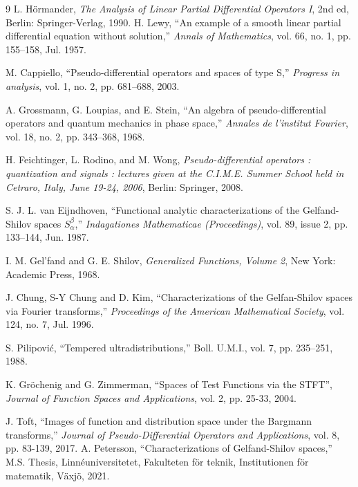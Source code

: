 \documentclass[11pt,a4paper,reqno]{amsart}
\numberwithin{equation}{section}
\theoremstyle{definition}
\theoremstyle{definition}
\begin{document}
\begin{thebibliography}{9}
    L. Hörmander,
    \emph{The Analysis of Linear Partial Differential Operators I}, 2nd ed,
    Berlin: Springer-Verlag,
    1990.
    H. Lewy,
    ``An example of a smooth linear partial differential equation without solution,''
    \emph{Annals of Mathematics}, vol. 66, no. 1, pp. 155--158, Jul. 1957.

    M. Cappiello,
    ``Pseudo-differential operators and spaces of type S,''
    \emph{Progress in analysis}, vol. 1, no. 2, pp. 681--688, 2003.
    
    A. Grossmann, G. Loupias, and E. Stein,
    ``An algebra of pseudo-differential operators and quantum mechanics in phase space,''
    \emph{Annales de l’institut Fourier}, vol. 18, no. 2, pp. 343--368, 
    1968.

    H. Feichtinger, L. Rodino, and M. Wong,
    \emph{Pseudo-differential operators : quantization and signals : lectures given at the C.I.M.E. Summer School held in Cetraro, Italy, June 19-24, 2006},
    Berlin: Springer,
    2008.
      
    S. J. L. van Eijndhoven,
    ``Functional analytic characterizations of the Gelfand-Shilov spaces $S_\alpha^\beta$,''
    \emph{Indagationes Mathematicae (Proceedings)}, vol. 89, issue 2, pp. 133--144, Jun. 1987.
    
    I. M. Gel'fand and G. E. Shilov,
    \emph{Generalized Functions, Volume 2}, New York: Academic Press, 1968.

    J. Chung, S-Y Chung and D. Kim,
    ``Characterizations of the Gelfan-Shilov spaces via Fourier transforms,'' 
    \emph{Proceedings of the American Mathematical Society}, vol. 124, no. 7, Jul. 1996.
    
    S. Pilipović, 
    ``Tempered ultradistributions,'' Boll. U.M.I., vol. 7, pp. 235--251,
    1988.

    K. Gröchenig and G. Zimmerman,
    ``Spaces of Test Functions via the STFT'',
    \emph{Journal of Function Spaces and Applications}, vol. 2, pp. 25-33, 2004.

    J. Toft,
    ``Images of function and distribution space under the Bargmann transforms,''
    \emph{Journal of Pseudo-Differential Operators and Applications}, vol. 8, pp. 83-139, 2017.
    A. Petersson,
    ``Characterizations of Gelfand-Shilov spaces,''
    M.S. Thesis, Linnéuniversitetet, Fakulteten för teknik, Institutionen för matematik, Växjö, 2021.


\end{thebibliography}
\end{document}
